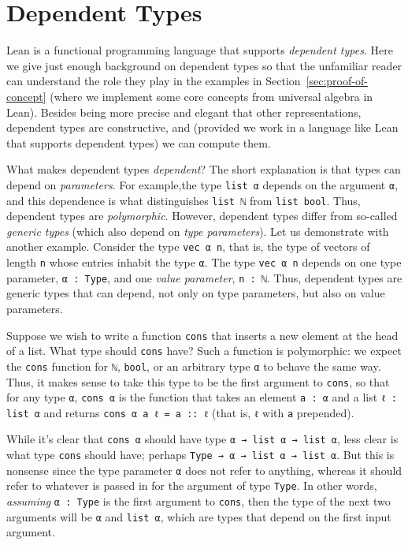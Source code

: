 \documentclass[11pt]{amsart}  %
\begin{document}
\section{Dependent Types}
Lean is a functional programming language that supports \emph{dependent types}.
Here we give just enough background on dependent types so that the unfamiliar reader can understand the role they play in the examples in Section~\ref{sec:proof-of-concept} (where we implement some core concepts from universal algebra in Lean).
Besides being more precise and elegant that other representations, dependent types are constructive, and (provided we work in a language like Lean that supports dependent types) we can compute them.

What makes dependent types \emph{dependent}? %
The short explanation is that types can depend on \emph{parameters}. For example,the type \lstinline{list α} depends on the argument \lstinline{α}, and this dependence is what distinguishes \lstinline{list ℕ} from \lstinline{list bool}. Thus, dependent types are \emph{polymorphic}.  However, dependent types differ from so-called \emph{generic types} (which also depend on \emph{type parameters}).  Let us demonstrate with another example.  
Consider the type \lstinline{vec α n}, that is, the type of vectors of length 
\lstinline{n} whose entries inhabit the type \lstinline{α}. The type \lstinline{vec α n} depends on one type parameter, \lstinline{α : Type}, and one \emph{value parameter}, \lstinline{n : ℕ}.  Thus, dependent types are generic types that can depend, not only on type parameters, but also on value parameters.

Suppose we wish to write a function \lstinline{cons} that inserts a new element at the head of a list. What type should \lstinline{cons} have? Such a function is polymorphic: we expect the \lstinline{cons} function for \lstinline{ℕ}, \lstinline{bool}, or an arbitrary type \lstinline{α} to behave the same way. Thus, it makes sense to take this type to be the first argument to \lstinline{cons}, so that for any type \lstinline{α}, \lstinline{cons α} is the function that takes an element \lstinline{a : α} and a list 
\lstinline{ℓ : list α} and returns \lstinline{cons α a ℓ = a :: ℓ} 
(that is, \lstinline{ℓ} with \lstinline{a} prepended).

While it's clear that \lstinline{cons α} should have type \lstinline{α → list α → list α}, less clear is what type \lstinline{cons} should have; perhaps \lstinline{Type → α → list α → list α}. But this is nonsense since the type parameter \lstinline{α} does not refer to anything, whereas it should refer to whatever is passed in for the argument of type \lstinline{Type}. In other words, \emph{assuming} \lstinline{α : Type} is the first argument to \lstinline{cons}, then the type of the next two arguments will be \lstinline{α} and \lstinline{list α}, which are types that depend on the first input argument. 
\end{document}
